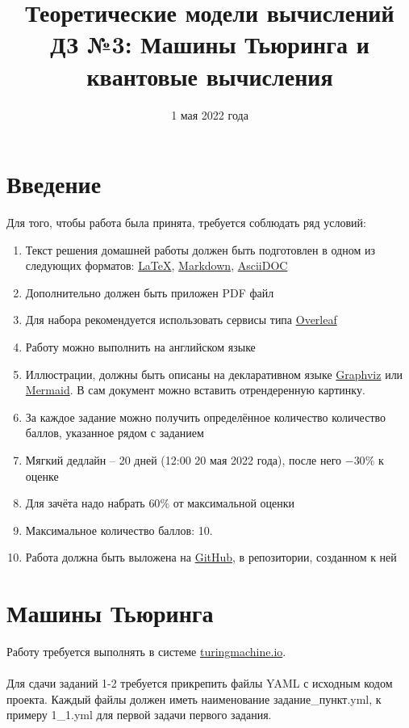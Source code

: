 \documentclass{article}
\title{Теоретические модели вычислений \\
ДЗ №3: Машины Тьюринга и квантовые вычисления}
\date{1 мая 2022 года}
\begin{document}
\maketitle

\section{Введение}

Для того, чтобы работа была принята, требуется соблюдать ряд условий:

\begin{enumerate}
    \item Текст решения домашней работы должен быть подготовлен в одном из следующих форматов: \href{https://www.latex-project.org/}{\LaTeX}, \href{https://en.wikipedia.org/wiki/Markdown}{Markdown}, \href{https://asciidoc-py.github.io/index.html}{AsciiDOC}
    \item Дополнительно должен быть приложен PDF файл
    \item Для набора рекомендуется использовать сервисы типа \href{https://www.overleaf.com}{Overleaf}
    \item Работу можно выполнить на английском языке
    \item Иллюстрации, должны быть описаны на декларативном языке \href{https://graphviz.org/}{Graphviz} или \href{https://mermaid-js.github.io/mermaid/#/}{Mermaid}. В сам документ можно вставить отрендеренную картинку.
    \item За каждое задание можно получить определённое количество количество баллов, указанное рядом с заданием
    \item Мягкий дедлайн -- 20 дней (12:00 20 мая 2022 года), после него $-30\%$ к оценке
    \item Для зачёта надо набрать $60\%$ от максимальной оценки
    \item Максимальное количество баллов: 10.
    \item Работа должна быть выложена на \href{https://github.com/}{GitHub}, в репозитории, созданном к ней
\end{enumerate}

\section{Машины Тьюринга}

Работу требуется выполнять в системе \url{turingmachine.io}. \\\\
Для сдачи заданий 1-2 требуется прикрепить файлы YAML с исходным кодом проекта. Каждый файлы должен иметь наименование задание\_пункт.yml, к примеру 1\_1.yml для первой задачи первого задания. \\\\
\end{document}
